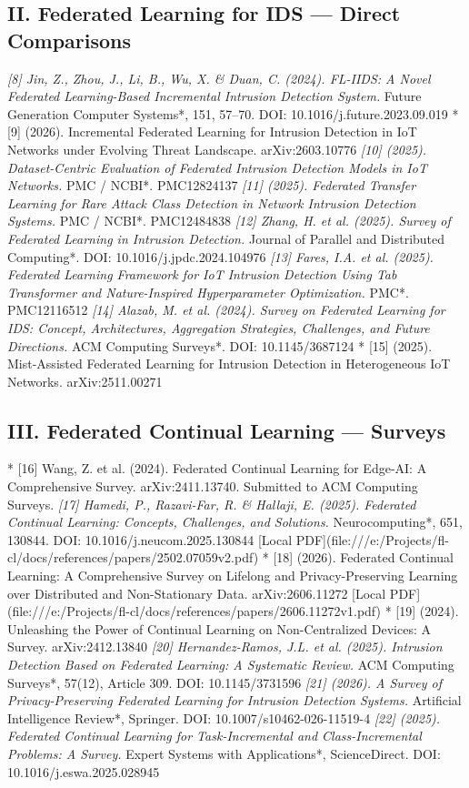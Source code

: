 \documentclass[conference]{IEEEtran}
\begin{document}
\subsection{II. Federated Learning for IDS — Direct Comparisons}
\textit{ [8] Jin, Z., Zhou, J., Li, B., Wu, X. \& Duan, C. (2024). FL-IIDS: A Novel Federated Learning-Based Incremental Intrusion Detection System. }Future Generation Computer Systems*, 151, 57–70. DOI: 10.1016/j.future.2023.09.019
* [9] (2026). Incremental Federated Learning for Intrusion Detection in IoT Networks under Evolving Threat Landscape. arXiv:2603.10776
\textit{ [10] (2025). Dataset-Centric Evaluation of Federated Intrusion Detection Models in IoT Networks. }PMC / NCBI*. PMC12824137
\textit{ [11] (2025). Federated Transfer Learning for Rare Attack Class Detection in Network Intrusion Detection Systems. }PMC / NCBI*. PMC12484838
\textit{ [12] Zhang, H. et al. (2025). Survey of Federated Learning in Intrusion Detection. }Journal of Parallel and Distributed Computing*. DOI: 10.1016/j.jpdc.2024.104976
\textit{ [13] Fares, I.A. et al. (2025). Federated Learning Framework for IoT Intrusion Detection Using Tab Transformer and Nature-Inspired Hyperparameter Optimization. }PMC*. PMC12116512
\textit{ [14] Alazab, M. et al. (2024). Survey on Federated Learning for IDS: Concept, Architectures, Aggregation Strategies, Challenges, and Future Directions. }ACM Computing Surveys*. DOI: 10.1145/3687124
* [15] (2025). Mist-Assisted Federated Learning for Intrusion Detection in Heterogeneous IoT Networks. arXiv:2511.00271


\subsection{III. Federated Continual Learning — Surveys}
* [16] Wang, Z. et al. (2024). Federated Continual Learning for Edge-AI: A Comprehensive Survey. arXiv:2411.13740. Submitted to ACM Computing Surveys.
\textit{ [17] Hamedi, P., Razavi-Far, R. \& Hallaji, E. (2025). Federated Continual Learning: Concepts, Challenges, and Solutions. }Neurocomputing*, 651, 130844. DOI: 10.1016/j.neucom.2025.130844 [Local PDF](file:///e:/Projects/fl-cl/docs/references/papers/2502.07059v2.pdf)
* [18] (2026). Federated Continual Learning: A Comprehensive Survey on Lifelong and Privacy-Preserving Learning over Distributed and Non-Stationary Data. arXiv:2606.11272 [Local PDF](file:///e:/Projects/fl-cl/docs/references/papers/2606.11272v1.pdf)
* [19] (2024). Unleashing the Power of Continual Learning on Non-Centralized Devices: A Survey. arXiv:2412.13840
\textit{ [20] Hernandez-Ramos, J.L. et al. (2025). Intrusion Detection Based on Federated Learning: A Systematic Review. }ACM Computing Surveys*, 57(12), Article 309. DOI: 10.1145/3731596
\textit{ [21] (2026). A Survey of Privacy-Preserving Federated Learning for Intrusion Detection Systems. }Artificial Intelligence Review*, Springer. DOI: 10.1007/s10462-026-11519-4
\textit{ [22] (2025). Federated Continual Learning for Task-Incremental and Class-Incremental Problems: A Survey. }Expert Systems with Applications*, ScienceDirect. DOI: 10.1016/j.eswa.2025.028945
\end{document}
